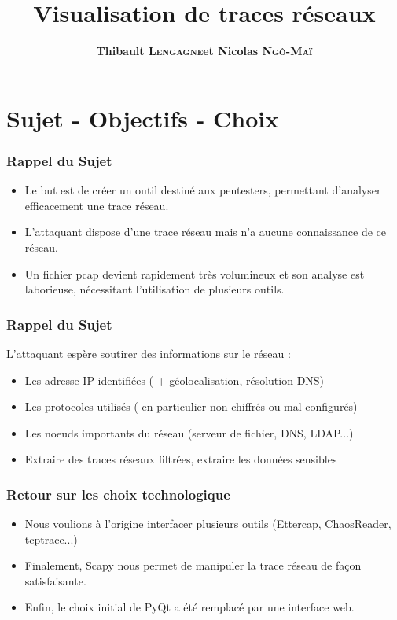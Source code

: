 \documentclass{beamer}
\title[Visualisation de traces réseaux]{Visualisation de traces réseaux}
\author{\textbf{Thibault \textsc{Lengagne}et Nicolas \textsc{Ngô-Maï}}}
\institute{Centrale Supélec - Campus de Rennes}
\begin{document}
  \begin{frame}
    \titlepage
  \end{frame}
  

 \section{Sujet - Objectifs - Choix}
  \begin{frame}
    \frametitle{Rappel du Sujet}
    \begin{itemize}
     \item Le but est de créer un outil destiné aux pentesters, permettant d'analyser efficacement une trace réseau.
     \item L'attaquant dispose d'une trace réseau mais n'a aucune connaissance de ce réseau.
     \item Un fichier pcap devient rapidement très volumineux et son analyse est laborieuse, nécessitant l'utilisation de plusieurs outils.
    \end{itemize}
  \end{frame}
  
  \begin{frame}
    \frametitle{Rappel du Sujet}
    L'attaquant espère soutirer des informations sur le réseau :
    \begin{itemize}
      \item Les adresse IP identifiées ( + géolocalisation, résolution DNS)
      \item Les protocoles utilisés ( en particulier non chiffrés ou mal configurés)
      \item Les noeuds importants du réseau (serveur de fichier, DNS, LDAP...)
      \item Extraire des traces réseaux filtrées, extraire les données sensibles
    \end{itemize}
  \end{frame}

  \begin{frame}
   \frametitle{Retour sur les choix technologique}
    \begin{itemize}
      \item Nous voulions à l'origine interfacer plusieurs outils (Ettercap, ChaosReader, tcptrace...) \\
      \item Finalement, Scapy nous permet de manipuler la trace réseau de façon satisfaisante. \\
      \item Enfin, le choix initial de PyQt a été remplacé par une interface web.
    \end{itemize}
  \end{frame}
  
\end{document}
